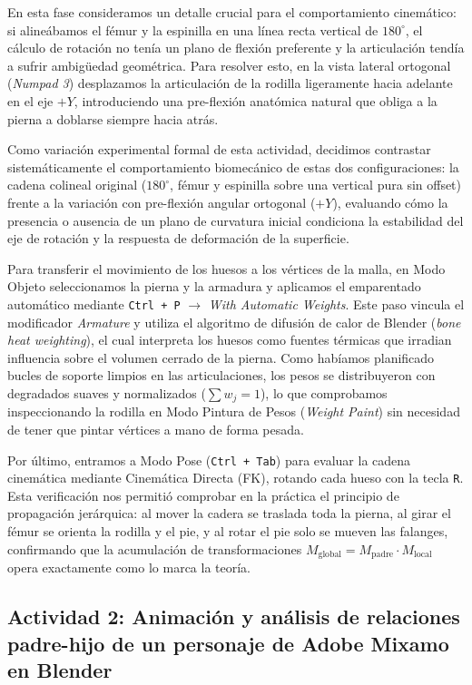 En esta fase consideramos un detalle crucial para el comportamiento cinemático: si alineábamos el fémur y la espinilla en una línea recta vertical de $180^\circ$, el cálculo de rotación no tenía un plano de flexión preferente y la articulación tendía a sufrir ambigüedad geométrica. Para resolver esto, en la vista lateral ortogonal (\textit{Numpad 3}) desplazamos la articulación de la rodilla ligeramente hacia adelante en el eje $+Y$, introduciendo una pre-flexión anatómica natural que obliga a la pierna a doblarse siempre hacia atrás.

Como variación experimental formal de esta actividad, decidimos contrastar sistemáticamente el comportamiento biomecánico de estas dos configuraciones: la cadena colineal original ($180^\circ$, fémur y espinilla sobre una vertical pura sin offset) frente a la variación con pre-flexión angular ortogonal ($+Y$), evaluando cómo la presencia o ausencia de un plano de curvatura inicial condiciona la estabilidad del eje de rotación y la respuesta de deformación de la superficie.

Para transferir el movimiento de los huesos a los vértices de la malla, en Modo Objeto seleccionamos la pierna y la armadura y aplicamos el emparentado automático mediante \texttt{Ctrl + P} $\to$ \textit{With Automatic Weights}. Este paso vincula el modificador \textit{Armature} y utiliza el algoritmo de difusión de calor de Blender (\textit{bone heat weighting}), el cual interpreta los huesos como fuentes térmicas que irradian influencia sobre el volumen cerrado de la pierna. Como habíamos planificado bucles de soporte limpios en las articulaciones, los pesos se distribuyeron con degradados suaves y normalizados ($\sum w_j = 1$), lo que comprobamos inspeccionando la rodilla en Modo Pintura de Pesos (\textit{Weight Paint}) sin necesidad de tener que pintar vértices a mano de forma pesada.

Por último, entramos a Modo Pose (\texttt{Ctrl + Tab}) para evaluar la cadena cinemática mediante Cinemática Directa (FK), rotando cada hueso con la tecla \texttt{R}. Esta verificación nos permitió comprobar en la práctica el principio de propagación jerárquica: al mover la cadera se traslada toda la pierna, al girar el fémur se orienta la rodilla y el pie, y al rotar el pie solo se mueven las falanges, confirmando que la acumulación de transformaciones $M_{\text{global}} = M_{\text{padre}} \cdot M_{\text{local}}$ opera exactamente como lo marca la teoría.

\subsection{Actividad 2: Animación y análisis de relaciones padre-hijo de un personaje de Adobe Mixamo en Blender}

